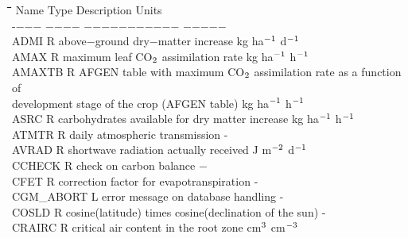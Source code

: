 \documentclass[11pt]{article}
\begin{document}
\begin{tabbing}
\hspace{1.27cm}\=\hspace{1.27cm}\=\hspace{1.27cm}\=\hspace{1.27cm}\=%
\hspace{1.27cm}\=\hspace{1.27cm}\=\hspace{1.27cm}\=\hspace{1.27cm}\=%
\hspace{1.27cm}\=\hspace{1.27cm}\=\kill
Name    \> \> Type   \> Description                                        \> \> \> \> \> \> \> Units\\
-$-$$-$$-$    \> \> $-$$-$$-$$-$   \> $-$$-$$-$$-$$-$$-$$-$$-$$-$$-$$-$                                        \> \> \> \> \> \> \> $-$$-$$-$$-$$-$ \\
ADMI    \> \> R   \> above$-$ground dry$-$matter increase                   \> \> \> \> \> \> \> kg ha$^{{\rm -1}}$ d$^{{\rm -1}}$\\
AMAX    \> \> R   \> maximum leaf CO$_{{\rm 2}}$ assimilation rate                 \> \> \> \> \> \> \> kg ha$^{{\rm -1}}$ h$^{{\rm -1}}$\\
AMAXTB\> \> R\> AFGEN table with maximum CO$_{{\rm 2}}$ assimilation rate as a function of\\
\>\> \> development stage of the crop (AFGEN table)\> \> \> \> \> \> \> kg ha$^{{\rm -1}}$ h$^{{\rm -1}}$\\
ASRC    \> \> R   \> carbohydrates available for dry matter increase    \> \> \> \> \> \> \> kg ha$^{{\rm -1}}$ h$^{{\rm -1}}$\\
ATMTR\> \> R\> daily atmospheric transmission\> \> \> \> \> \> \> -\\
AVRAD   \> \> R   \> shortwave radiation actually received              \> \> \> \> \> \> \> J m$^{{\rm -2}}$ d$^{{\rm -1}}$\\
CCHECK  \> \> R   \> check on carbon balance                            \> \> \> \> \> \> \> $-$\\
CFET\> \> R\> correction factor for evapotranspiration\> \> \> \> \> \> \> -\\
CGM\_ABORT\> \> L\> error message on database handling\> \> \> \> \> \> \> -\\
COSLD   \> \> R   \> cosine(latitude) times cosine(declination of the sun)             \> \> \> \> \> \> \> -\\
CRAIRC\> \> R\> critical air content in the root zone\> \> \> \> \> \> \> cm$^{{\rm 3}}$ cm$^{{\rm -3}}$\\
$$
\end{tabbing}
\end{document}
